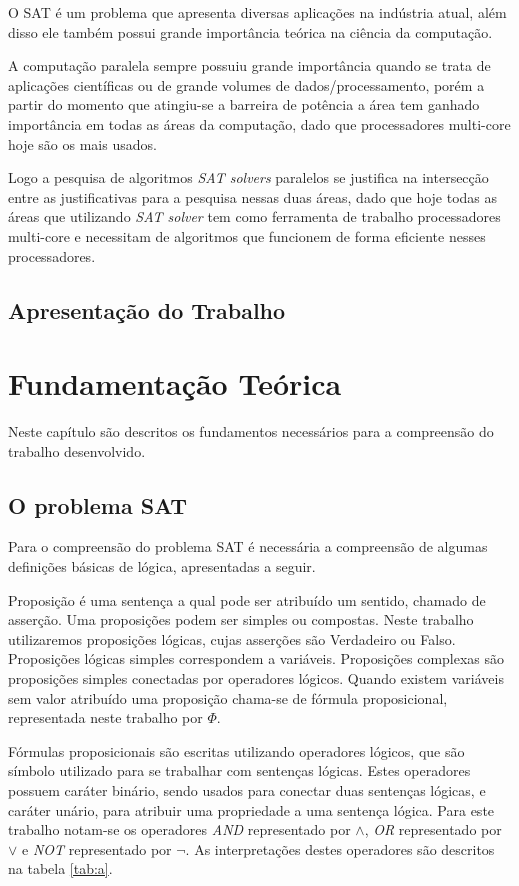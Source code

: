 \documentclass{ufsc-thesis}
\begin{document}
O SAT é um problema que apresenta diversas aplicações na indústria
atual, além disso ele também possui grande importância teórica 
na ciência da computação.

A computação paralela sempre possuiu grande importância quando 
se trata de aplicações científicas ou de grande volumes de 
dados/processamento, porém a partir do momento que atingiu-se 
a barreira de potência a área tem ganhado importância em todas as 
áreas da computação, dado que processadores multi-core hoje são 
os mais usados.

Logo a pesquisa de algoritmos \textit{SAT solvers} paralelos se justifica na 
intersecção entre as justificativas para a pesquisa nessas duas áreas,
dado que hoje todas as áreas que utilizando \textit{SAT solver} tem como ferramenta 
de trabalho processadores multi-core e necessitam de algoritmos que 
funcionem de forma eficiente nesses processadores.

\section{Apresentação do Trabalho}

\chapter{Fundamentação Teórica}
\label{chap:fund}

Neste capítulo são descritos os fundamentos necessários para a
compreensão do trabalho desenvolvido.

\section{O problema SAT}
\label{sec:sat}

Para o compreensão do problema SAT é necessária a compreensão 
de algumas definições básicas de lógica, apresentadas a seguir.

Proposição é uma sentença a qual pode ser atribuído um sentido, 
chamado de asserção. Uma proposições podem ser simples ou compostas. Neste 
trabalho utilizaremos proposições lógicas, cujas asserções são 
Verdadeiro ou Falso. Proposições lógicas simples correspondem a 
variáveis. Proposições complexas são 
proposições simples conectadas por operadores lógicos. Quando 
existem variáveis sem valor atribuído uma proposição chama-se 
de fórmula proposicional, representada neste trabalho por $\Phi$.

Fórmulas proposicionais são escritas utilizando operadores lógicos,
que são símbolo utilizado para se trabalhar com sentenças lógicas. 
Estes operadores possuem caráter binário, sendo usados para conectar 
duas sentenças lógicas, e caráter unário, para atribuir uma propriedade 
a uma sentença lógica. Para este trabalho notam-se os operadores 
\textit{AND} representado por $\wedge$, \textit{OR} representado 
por $\vee$ e \textit{NOT} representado por $\neg$. As interpretações 
destes operadores são descritos na tabela \ref{tab:a}.
\end{document}
